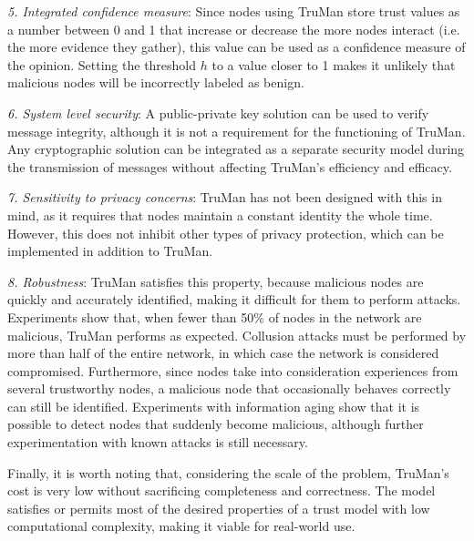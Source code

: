 \textit{5. Integrated confidence measure}:
Since nodes using TruMan store trust values as a number between 0 and 1 that increase or decrease the more nodes interact (i.e. the more evidence they gather), this value can be used as a confidence measure of the opinion.
Setting the threshold $h$ to a value closer to 1 makes it unlikely that malicious nodes will be incorrectly labeled as benign.

\textit{6. System level security}:
A public-private key solution can be used to verify message integrity, although it is not a requirement for the functioning of TruMan.
Any cryptographic solution can be integrated as a separate security model during the transmission of messages without affecting TruMan's efficiency and efficacy.

\textit{7. Sensitivity to privacy concerns}:
TruMan has not been designed with this in mind, as it requires that nodes maintain a constant identity the whole time.
However, this does not inhibit other types of privacy protection, which can be implemented in addition to TruMan.

\textit{8. Robustness}:
TruMan satisfies this property, because malicious nodes are quickly and accurately identified, making it difficult for them to perform attacks.
Experiments show that, when fewer than 50\% of nodes in the network are malicious, TruMan performs as expected.
Collusion attacks must be performed by more than half of the entire network, in which case the network is considered compromised.
Furthermore, since nodes take into consideration experiences from several trustworthy nodes, a malicious node that occasionally behaves correctly can still be identified.
Experiments with information aging show that it is possible to detect nodes that suddenly become malicious, although further experimentation with known attacks is still necessary.

Finally, it is worth noting that, considering the scale of the problem, TruMan's cost is very low without sacrificing completeness and correctness.
The model satisfies or permits most of the desired properties of a trust model with low computational complexity, making it viable for real-world use.

